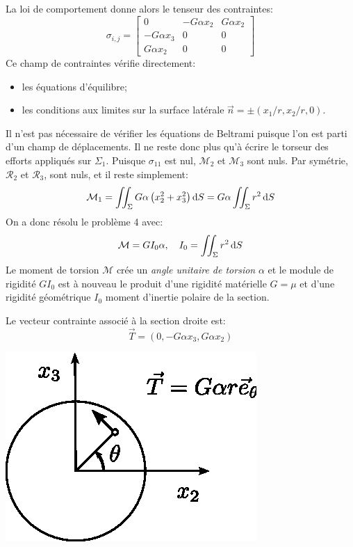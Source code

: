La loi de comportement donne alors le tenseur des contraintes:
\begin{equation}
    \sigma_{i,j} = 
    \begin{bmatrix}
        0 & -G\alpha x_2 & G\alpha x_2 \\
        -G \alpha x_3 & 0 & 0 \\
        G \alpha x_2 & 0 & 0
    \end{bmatrix}
    \label{eq:Ch07-039}
\end{equation}
Ce champ de contraintes vérifie directement:
\begin{itemize}
    \item les équations d'équilibre;
    \item les conditions aux limites sur la surface latérale $\vec{n} = \pm \left( x_1/r, x_2/r, 0 \right)$.
\end{itemize}
Il n'est pas nécessaire de vérifier les équations de  Beltrami puisque l'on est parti d'un champ de déplacements.
Il ne reste donc plus qu'à écrire le torseur des efforts appliqués sur $\Sigma_1$.
Puisque $\sigma_{11}$ est nul, $\mathcal{M}_2$ et $\mathcal{M}_3$ sont nuls.
Par symétrie, $\mathcal{R}_2$ et $\mathcal{R}_3$, sont nuls, et il reste simplement:
\begin{equation}
    \mathcal{M}_1 = \iint_{\Sigma} G \alpha \left( x_2^2 + x_3^2 \right) \mathop{\mathrm{{}d}}\mathopen{} S = G\alpha \iint_{\Sigma} r^2 \mathop{\mathrm{{}d}}\mathopen{} S    
    \label{eq:Ch07-040} 
\end{equation}
On a donc résolu le problème 4 avec:
\begin{equation}
    \mathcal{M} = G I_0 \alpha,\quad I_0 = \iint_{\Sigma} r^2 \mathop{\mathrm{{}d}}\mathopen{} S
    \label{eq:Ch07-041}
\end{equation}
Le moment de torsion $\mathcal{M}$ crée un \emph{angle unitaire de torsion} $\alpha$ et le module de rigidité $G I_0$ est à nouveau le produit d'une rigidité matérielle $G=\mu$ et d'une rigidité géométrique $I_0$ moment d'inertie polaire de la section.

Le vecteur contrainte associé à la section droite est:
\begin{equation}
    \vec{T} = \left( 0, -G\alpha x_3, G \alpha x_2 \right)
    \label{eq:Ch07-042}
\end{equation}

    \begin{center}
        \includegraphics{../images/T1_Ch07-11}
    \end{center}

